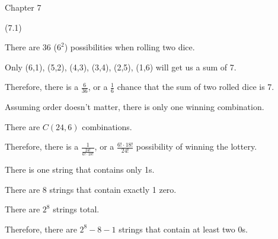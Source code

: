 \documentclass{exam}
\begin{document}
\begin{questions}
\vspace{10pt}
{\Large Chapter 7}
\vspace{2pt}

 (7.1)

\begin{center}
There are 36 (\(6^2\)) possibilities when rolling two dice.

Only (6,1), (5,2), (4,3), (3,4), (2,5), (1,6) will get us a sum of 7.

Therefore, there is a \(\frac{6}{36}\), or a \(\frac{1}{6}\) chance that the sum of two rolled dice is 7.
\end{center}


\begin{center}
Assuming order doesn't matter, there is only one winning combination.

There are \(C(24, 6)\) combinations.

Therefore, there is a \(\frac{1}{\frac{24!}{6! \cdot 18!}}\), or a \(\frac{6! \cdot 18!}{24!}\) possibility of winning the lottery.
\end{center}

\newpage


\begin{center}
There is one string that contains only 1s.

There are 8 strings that contain exactly 1 zero.

There are \(2^8\) strings total.

Therefore, there are \(2^8 - 8 - 1\) strings that contain at least two 0s.
\end{center}


\begin{center}


\end{center}
\end{questions}
\end{document}
